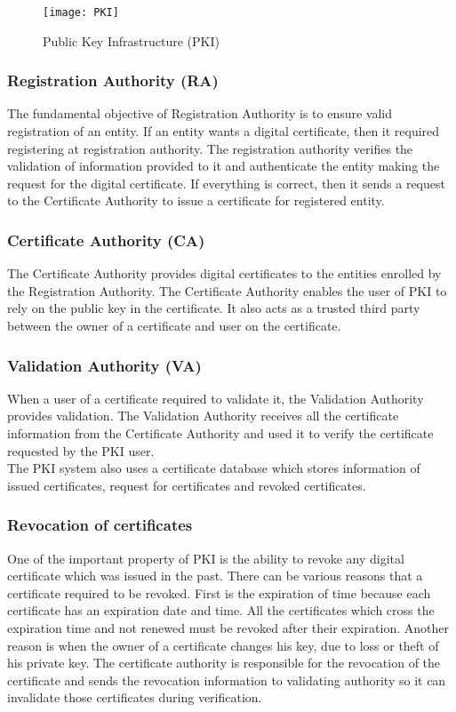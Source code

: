 \begin{figure}[h]
    \centering
    \texttt{[image: PKI]}
    \caption{Public Key Infrastructure (PKI) }
    \label{fig:PKI}
\end{figure}

\subsubsection{Registration Authority (RA)} The fundamental objective of Registration Authority is to ensure valid registration of an entity. If an entity wants a digital certificate, then it required registering at registration authority. The registration authority verifies the validation of information provided to it and authenticate the entity making the request for the digital certificate. If everything is correct, then it sends a request to the Certificate Authority to issue a certificate for registered entity.
\subsubsection{Certificate Authority (CA)} The Certificate Authority provides digital certificates to the entities enrolled by the Registration Authority. The Certificate Authority enables the user of PKI to rely on the public key in the certificate. It also acts as a trusted third party between the owner of a certificate and user on the certificate.
\subsubsection{Validation Authority (VA)} When a user of a certificate required to validate it, the Validation Authority provides validation. The Validation Authority receives all the certificate information from the Certificate Authority and used it to verify the certificate requested by the PKI user.\\
 
The PKI system also uses a certificate database which stores information of issued certificates, request for certificates and revoked certificates.

\subsubsection{Revocation of certificates} One of the important property of PKI is the ability to revoke any digital certificate which was issued in the past. There can be various reasons that a certificate required to be revoked. First is the expiration of time because each certificate has an expiration date and time. All the certificates which cross the expiration time and not renewed must be revoked after their expiration. Another reason is when the owner of a certificate changes his key, due to loss or theft of his private key. The certificate authority is responsible for the revocation of the certificate and sends the revocation information to validating authority so it can invalidate those certificates during verification.

